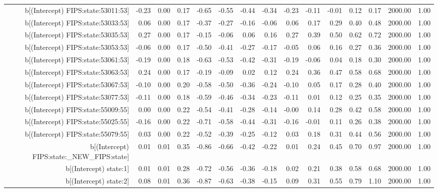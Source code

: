 \begin{table}[ht]
\begin{tabular}{rrrrrrrrrrrrrrr}
  b[(Intercept) FIPS:state:53011:53] & -0.23 & 0.00 & 0.17 & -0.65 & -0.55 & -0.44 & -0.34 & -0.23 & -0.11 & -0.01 & 0.12 & 0.17 & 2000.00 & 1.00 \\ 
  b[(Intercept) FIPS:state:53033:53] & 0.06 & 0.00 & 0.17 & -0.37 & -0.27 & -0.16 & -0.06 & 0.06 & 0.17 & 0.29 & 0.40 & 0.48 & 2000.00 & 1.00 \\ 
  b[(Intercept) FIPS:state:53035:53] & 0.27 & 0.00 & 0.17 & -0.15 & -0.06 & 0.06 & 0.16 & 0.27 & 0.39 & 0.50 & 0.62 & 0.72 & 2000.00 & 1.00 \\ 
  b[(Intercept) FIPS:state:53053:53] & -0.06 & 0.00 & 0.17 & -0.50 & -0.41 & -0.27 & -0.17 & -0.05 & 0.06 & 0.16 & 0.27 & 0.36 & 2000.00 & 1.00 \\ 
  b[(Intercept) FIPS:state:53061:53] & -0.19 & 0.00 & 0.18 & -0.63 & -0.53 & -0.42 & -0.31 & -0.19 & -0.06 & 0.04 & 0.18 & 0.30 & 2000.00 & 1.00 \\ 
  b[(Intercept) FIPS:state:53063:53] & 0.24 & 0.00 & 0.17 & -0.19 & -0.09 & 0.02 & 0.12 & 0.24 & 0.36 & 0.47 & 0.58 & 0.68 & 2000.00 & 1.00 \\ 
  b[(Intercept) FIPS:state:53067:53] & -0.10 & 0.00 & 0.20 & -0.58 & -0.50 & -0.36 & -0.24 & -0.10 & 0.05 & 0.17 & 0.28 & 0.40 & 2000.00 & 1.00 \\ 
  b[(Intercept) FIPS:state:53077:53] & -0.11 & 0.00 & 0.18 & -0.59 & -0.46 & -0.34 & -0.23 & -0.11 & 0.01 & 0.12 & 0.25 & 0.35 & 2000.00 & 1.00 \\ 
  b[(Intercept) FIPS:state:55009:55] & 0.00 & 0.00 & 0.22 & -0.54 & -0.41 & -0.28 & -0.14 & -0.00 & 0.14 & 0.28 & 0.42 & 0.58 & 2000.00 & 1.00 \\ 
  b[(Intercept) FIPS:state:55025:55] & -0.16 & 0.00 & 0.22 & -0.71 & -0.58 & -0.44 & -0.31 & -0.16 & -0.01 & 0.11 & 0.26 & 0.38 & 2000.00 & 1.00 \\ 
  b[(Intercept) FIPS:state:55079:55] & 0.03 & 0.00 & 0.22 & -0.52 & -0.39 & -0.25 & -0.12 & 0.03 & 0.18 & 0.31 & 0.44 & 0.56 & 2000.00 & 1.00 \\ 
  b[(Intercept) FIPS:state:\_NEW\_FIPS:state] & 0.01 & 0.01 & 0.35 & -0.86 & -0.66 & -0.42 & -0.22 & 0.01 & 0.24 & 0.45 & 0.70 & 0.97 & 2000.00 & 1.00 \\ 
  b[(Intercept) state:1] & 0.01 & 0.01 & 0.28 & -0.72 & -0.56 & -0.36 & -0.18 & 0.02 & 0.21 & 0.38 & 0.58 & 0.68 & 2000.00 & 1.00 \\ 
  b[(Intercept) state:2] & 0.08 & 0.01 & 0.36 & -0.87 & -0.63 & -0.38 & -0.15 & 0.09 & 0.31 & 0.55 & 0.79 & 1.10 & 2000.00 & 1.00 \\ 

\end{tabular}
\end{table}
